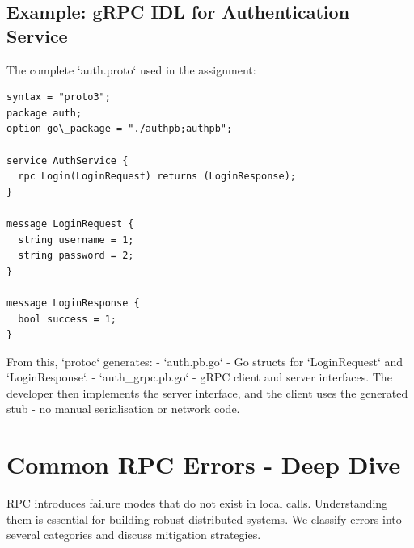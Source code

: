 \documentclass[a4paper]{article}
\begin{document}
\subsection{Example: gRPC IDL for Authentication Service}
The complete `auth.proto` used in the assignment:
\begin{lstlisting}
syntax = "proto3";
package auth;
option go\_package = "./authpb;authpb";

service AuthService {
  rpc Login(LoginRequest) returns (LoginResponse);
}

message LoginRequest {
  string username = 1;
  string password = 2;
}

message LoginResponse {
  bool success = 1;
}
\end{lstlisting}
From this, `protoc` generates:
- `auth.pb.go` - Go structs for `LoginRequest` and `LoginResponse`.
- `auth\_grpc.pb.go` - gRPC client and server interfaces.
The developer then implements the server interface, and the client uses the generated stub - no manual serialisation or network code.


























































\section{Common RPC Errors - Deep Dive}
RPC introduces failure modes that do not exist in local calls. Understanding them is essential for building robust distributed systems. We classify errors into several categories and discuss mitigation strategies.
\end{document}
